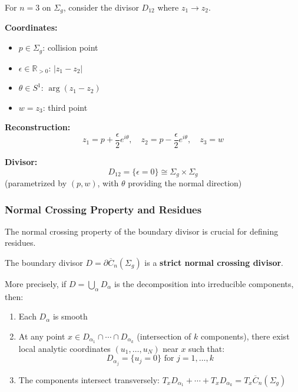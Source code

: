 \begin{example}\label{ex:three-points-coords}
For $n=3$ on $\Sigma_g$, consider the divisor $D_{12}$ where $z_1 \to z_2$.

\textbf{Coordinates:}
\begin{itemize}
\item $p \in \Sigma_g$: collision point
\item $\epsilon \in \mathbb{R}_{>0}$: $|z_1 - z_2|$
\item $\theta \in S^1$: $\arg(z_1 - z_2)$
\item $w = z_3$: third point
\end{itemize}

\textbf{Reconstruction:}
$$z_1 = p + \frac{\epsilon}{2}e^{i\theta}, \quad z_2 = p - \frac{\epsilon}{2}e^{i\theta}, \quad z_3 = w$$

\textbf{Divisor:}
$$D_{12} = \{\epsilon = 0\} \cong \Sigma_g \times \Sigma_g$$
(parametrized by $(p,w)$, with $\theta$ providing the normal direction)
\end{example}

\subsubsection{Normal Crossing Property and Residues}

The normal crossing property of the boundary divisor is crucial for defining residues.

\begin{theorem}\label{thm:normal-crossings}
The boundary divisor $D = \partial\overline{C}_n(\Sigma_g)$ is a \textbf{strict normal crossing divisor}. 

More precisely, if $D = \bigcup_{\alpha} D_\alpha$ is the decomposition into irreducible components, then:
\begin{enumerate}
\item Each $D_\alpha$ is smooth
\item At any point $x \in D_{\alpha_1} \cap \cdots \cap D_{\alpha_k}$ (intersection of $k$ components), there exist local analytic coordinates $(u_1, \ldots, u_N)$ near $x$ such that:
$$D_{\alpha_j} = \{u_j = 0\} \text{ for } j = 1,\ldots,k$$
\item The components intersect transversely: $T_x D_{\alpha_1} + \cdots + T_x D_{\alpha_k} = T_x \overline{C}_n(\Sigma_g)$
\end{enumerate}
\end{theorem}

